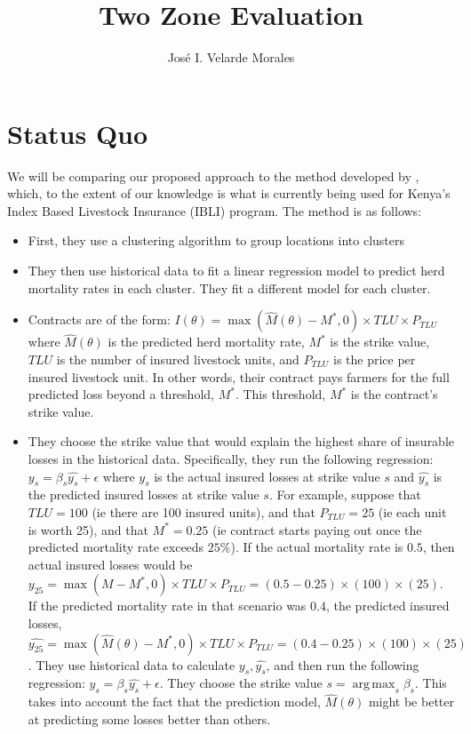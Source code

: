 \documentclass[11pt]{article}
\title{Two Zone Evaluation}
\author{José I. Velarde Morales}
\DeclareMathOperator*{\argmax}{arg\,max}
\begin{document}
\maketitle

\section{Status Quo}
We will be comparing our proposed approach to the method developed by \cite{chantarat2013designing}, which, to the extent of our knowledge is what is currently being used for Kenya's Index Based Livestock Insurance (IBLI) program. The method is as follows: 
\begin{itemize}
    \item First, they use a clustering algorithm to group locations into clusters
    \item They then use historical data to fit a linear regression model to predict herd mortality rates in each cluster. They fit a different model for each cluster. 
    \item Contracts are of the form: $I(\theta) = \max(\hat{M}(\theta)-M^*,0)\times TLU \times P_{TLU}$ where $\hat{M}(\theta)$ is the predicted herd mortality rate, $M^*$ is the strike value, $TLU$ is the number of insured livestock units, and $P_{TLU}$ is the price per insured livestock unit.  In other words, their contract pays farmers for the full predicted loss beyond a threshold, $M^*$. This threshold, $M^*$ is the contract's strike value. 
    \item They choose the strike value that would explain the highest share of insurable losses in the historical data. Specifically, they run the following regression: $y_s = \beta_s \hat{y_s}+\epsilon$ where $y_s$ is the actual insured losses at strike value $s$ and $\hat{y_s}$ is the predicted insured losses at strike value $s$. For example, suppose that $TLU=100$ (ie there are 100 insured units), and that $P_{TLU}=25$ (ie each unit is worth 25), and that $M^* = 0.25$ (ie contract starts paying out once the predicted mortality rate exceeds $25\%$). If the actual mortality rate is $0.5$, then actual insured losses would be $y_{25} = \max(M-M^*,0)\times TLU \times P_{TLU} = (0.5-0.25)\times(100) \times (25)$. If the predicted mortality rate in that scenario was $0.4$, the predicted insured losses, $\hat{y_{25}} = \max(\hat{M}(\theta)-M^*,0)\times TLU \times P_{TLU} = (0.4-0.25)\times(100) \times (25)$. They use historical data to calculate $y_s, \hat{y_s}$, and then run the following regression: $y_s = \beta_s \hat{y_s}+\epsilon$. They choose the strike value $s= \argmax_s \beta_s$. This takes into account the fact that the prediction model, $\hat{M}(\theta)$ might be better at predicting some losses better than others. 
\end{itemize}
\end{document}
